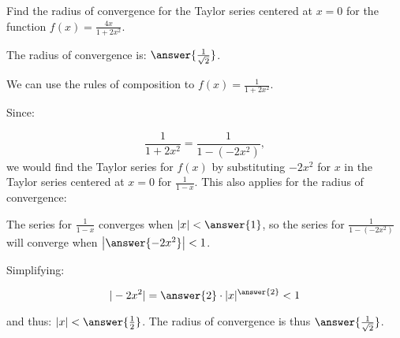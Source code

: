 \documentclass{ximera}
\author{Jim Talamo}
\begin{document}
\begin{exercise}
Find the radius of convergence for the Taylor series centered at $x=0$ for the function $f(x) = \frac{4x}{1+2x^2}$. 

The radius of convergence is: $\answer{\frac{1}{\sqrt{2}}}$.

\begin{hint}
We can use the rules of composition to  $f(x) = \frac{1}{1+2x^2}$.  

Since:

\[
 \frac{1}{1+2x^2} =  \frac{1}{1-(-2x^2)},
\]
we would find the Taylor series for $f(x)$ by substituting $-2x^2$ for $x$ in the Taylor  series centered at $x=0$ for $ \frac{1}{1-x}$.  This also applies for the radius of convergence:

The series for $\frac{1}{1-x}$ converges when $|x|<\answer{1}$, so the series for $ \frac{1}{1-(-2x^2)}$ will converge when $\left|\answer{-2x^2}\right|<1$.  

\begin{question}
Simplifying:

\[|-2x^2| = \answer{2} \cdot |x|^{\answer{2}} <1\]

and thus: $|x| < \answer{\frac{1}{2}}$.  The radius of convergence is thus $\answer{\frac{1}{\sqrt{2}}}$.

\end{question}

\end{hint}
\end{exercise}
\end{document}
